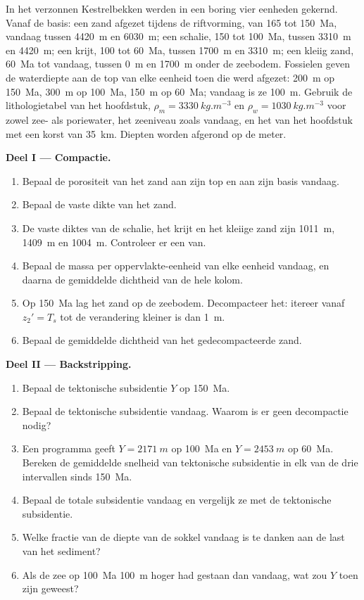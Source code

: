 \begin{problem}\label{pb:b2:basins-compared:1}
In het verzonnen Kestrelbekken werden in een boring vier eenheden gekernd. Vanaf de basis: een zand afgezet tijdens
de riftvorming, van 165 tot \qty{150}{Ma}, vandaag tussen \qty{4420}{m} en \qty{6030}{m}; een schalie, 150
tot \qty{100}{Ma}, tussen \qty{3310}{m} en \qty{4420}{m}; een krijt, 100 tot \qty{60}{Ma}, tussen
\qty{1700}{m} en \qty{3310}{m}; een kleiig zand, \qty{60}{Ma} tot vandaag, tussen \qty{0}{m} en
\qty{1700}{m} onder de zeebodem. Fossielen geven de waterdiepte aan de top van elke eenheid toen die
werd afgezet: \qty{200}{m} op \qty{150}{Ma}, \qty{300}{m} op \qty{100}{Ma}, \qty{150}{m} op
\qty{60}{Ma}; vandaag is ze \qty{100}{m}. Gebruik de lithologietabel van het hoofdstuk, $\rho_m =
\qty{3330}{kg.m^{-3}}$ en $\rho_w = \qty{1030}{kg.m^{-3}}$ voor zowel zee- als poriewater, het zeeniveau
zoals vandaag, en het  van het hoofdstuk met een korst van \qty{35}{km}. Diepten worden afgerond op
de meter.

\noindent\textbf{Deel I --- Compactie.}
\begin{enumerate}
  \item Bepaal de porositeit van het zand aan zijn top en aan zijn basis vandaag.
  \item Bepaal de vaste dikte van het zand.
  \item De vaste diktes van de schalie, het krijt en het kleiige zand zijn \qty{1011}{m},
        \qty{1409}{m} en \qty{1004}{m}. Controleer er een van.
  \item Bepaal de massa per oppervlakte-eenheid van elke eenheid vandaag, en daarna de gemiddelde dichtheid van de hele
        kolom.
  \item Op \qty{150}{Ma} lag het zand op de zeebodem. Decompacteer het: itereer vanaf $z_2' =
        T_s$ tot de verandering kleiner is dan \qty{1}{m}.
  \item Bepaal de gemiddelde dichtheid van het gedecompacteerde zand.
\end{enumerate}

\noindent\textbf{Deel II --- Backstripping.}
\begin{enumerate}[resume]
  \item Bepaal de tektonische subsidentie $Y$ op \qty{150}{Ma}.
  \item Bepaal de tektonische subsidentie vandaag. Waarom is er geen decompactie nodig?
  \item Een programma geeft $Y = \qty{2171}{m}$ op \qty{100}{Ma} en $Y = \qty{2453}{m}$ op
        \qty{60}{Ma}. Bereken de gemiddelde snelheid van tektonische subsidentie in elk van de drie
        intervallen sinds \qty{150}{Ma}.
  \item Bepaal de totale subsidentie vandaag en vergelijk ze met de tektonische subsidentie.
  \item Welke fractie van de diepte van de sokkel vandaag is te danken aan de last van het sediment?
  \item Als de zee op \qty{100}{Ma} \qty{100}{m} hoger had gestaan dan vandaag, wat zou $Y$
        toen zijn geweest?
\end{enumerate}


\end{problem}
